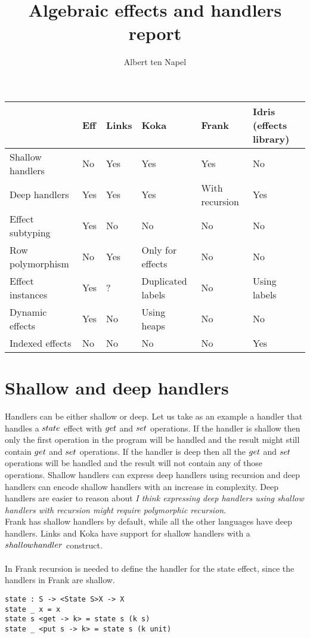 \documentclass[12pt]{article}
\title{Algebraic effects and handlers report}
\author{Albert ten Napel}
\date{}
\begin{document}
\maketitle

\newpage
\hfill
\begin{adjustbox}{angle=90}
\begin{tabular}{ l | l | l | l | l | l }
			& Eff\cite{eff1}\cite{eff2}		& Links \cite{links} 	& Koka\cite{koka}	& Frank\cite{frank} 		& Idris (effects library)\cite{idris}	\\ \hline
Shallow handlers 	& No		& Yes 		& Yes 			& Yes 			& No 				\\ \hline
Deep handlers 	& Yes		& Yes 		& Yes 			& With recursion 	& Yes 				\\ \hline
Effect subtyping	& Yes		& No		& No			& No			& No	 			\\ \hline
Row polymorphism	& No		& Yes		& Only for effects 	& No			& No 				\\ \hline
Effect instances	& Yes		& ?		& Duplicated labels 	& No			& Using labels		\\ \hline
Dynamic effects	& Yes		& No		& Using heaps      	& No			& No 				\\ \hline
Indexed effects	& No		& No		& No			& No			& Yes 				\\
\end{tabular}
\end{adjustbox}
\hfill
\null

\newpage
\section{Shallow and deep handlers}
Handlers can be either shallow or deep. Let us take as an example a handler that handles a $\mathnormal{state}$ effect with $\mathnormal{get}$ and $\mathnormal{set}$ operations.
If the handler is shallow then only the first operation in the program will be handled and the result might still contain $\mathnormal{get}$ and $\mathnormal{set}$ operations.
If the handler is deep then all the  $\mathnormal{get}$ and $\mathnormal{set}$ operations will be handled and the result will not contain any of those operations.
Shallow handlers can express deep handlers using recursion and deep handlers can encode shallow handlers with an increase in complexity.
Deep handlers are easier to reason about \textit{I think expressing deep handlers using shallow handlers with recursion might require polymorphic recursion}. \\
Frank has shallow handlers by default, while all the other languages have deep handlers. Links and Koka have support for shallow handlers with a $\mathnormal{shallowhandler}$ construct.
\\\\
In Frank recursion is needed to define the handler for the state effect, since the handlers in Frank are shallow.
\begin{lstlisting}
state : S -> <State S>X -> X
state _ x = x
state s <get -> k> = state s (k s)
state _ <put s -> k> = state s (k unit)
\end{lstlisting}
\end{document}
